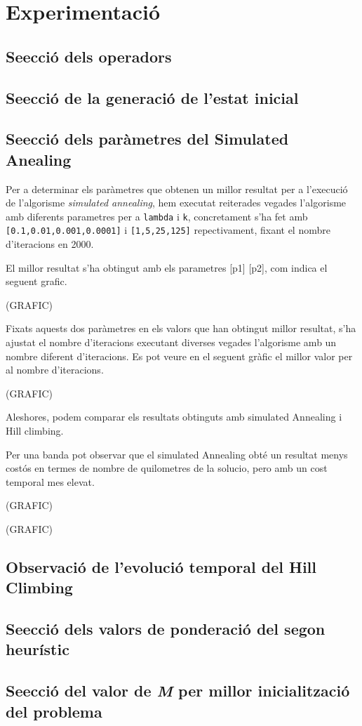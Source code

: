 \section{Experimentació}

\subsection{Se\lgem ecció dels operadors}

\subsection{Se\lgem ecció de la generació de l'estat inicial}

\subsection{Se\lgem ecció dels paràmetres del Simulated Anealing}
Per a determinar els paràmetres que obtenen un millor resultat per a l'execució de l'algorisme \emph{simulated annealing},
hem executat reiterades vegades l'algorisme amb diferents parametres per a \texttt{lambda} i \texttt{k}, concretament s'ha fet amb
\texttt{[0.1,0.01,0.001,0.0001]} i \texttt{[1,5,25,125]} repectivament, fixant el nombre d'iteracions en 2000.

El millor resultat s'ha obtingut amb els parametres [p1] [p2], com indica el seguent grafic.

(GRAFIC)

Fixats aquests dos paràmetres en els valors que han obtingut millor resultat, s'ha ajustat el nombre d'iteracions executant diverses 
vegades l'algorisme amb un nombre diferent d'iteracions. Es pot veure en el seguent gràfic el millor valor per al nombre d'iteracions.



(GRAFIC)

Aleshores, podem comparar els resultats obtinguts amb simulated Annealing i Hill climbing.

Per una banda pot observar que el simulated Annealing obté un resultat menys costós en termes de nombre de quilometres de la solucio,
 pero amb un cost temporal mes elevat.

(GRAFIC)

(GRAFIC)


\subsection{Observació de l'evolució temporal del Hill Climbing}

\subsection{Se\lgem ecció dels valors de ponderació del segon heurístic}

\subsection{Se\lgem ecció del valor de \emph{M} per millor inicialització del problema}